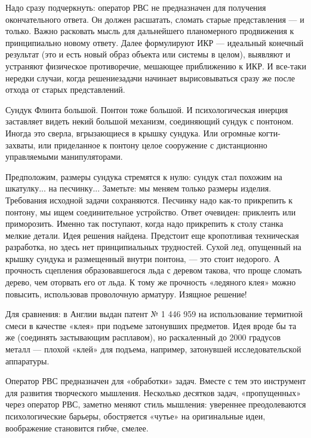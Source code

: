 Надо  сразу подчеркнуть:  оператор РВС  не предназначен  для получения
окончательного   ответа.   Он   должен   расшатать,   сломать   старые
представления  —  и  только.  Важно расковать  мысль  для  дальнейшего
планомерного   продвижения  к   принципиально  новому   ответу.  Далее
формулируют  ИКР —  идеальный  конечный результат  (это  и есть  новый
образ объекта  или системы в  целом), выявляют и  устраняют физическое
противоречие, мешающее  приближению к ИКР. И  все-таки нередки случаи,
когда решениезадачи  начинает вырисовываться сразу же  после отхода от
старых представлений.

Сундук Флинта большой. Понтон  тоже большой. И психологическая инерция
заставляет  видеть  некий  большой   механизм,  соединяющий  сундук  с
понтоном.  Иногда  это  сверла,  вгрызающиеся в  крышку  сундука.  Или
огромные когти-захваты,  или приделанное к понтону  целое сооружение с
дистанционно управляемыми манипуляторами.

Предположим,  размеры сундука  стремятся к  нулю: сундук  стал похожим
на  шкатулку...  на песчинку...  Заметьте:  мы  меняем только  размеры
изделия. Требования исходной задачи  сохраняются. Песчинку надо как-то
прикрепить  к  понтону,  мы   ищем  соединительное  устройство.  Ответ
очевиден: приклеить или приморозить.  Именно так поступают, когда надо
прикрепить  к  столу  станка  мелкие  детали.  Идея  решения  найдена.
Предстоит  еще  кропотливая  техническая   разработка,  но  здесь  нет
принципиальных  трудностей. Сухой  лед,  опущенный  на крышку  сундука
и  размещенный  внутри понтона,  —  это  стоит недорого.  А  прочность
сцепления  образовавшегося льда  с деревом  такова, что  проще сломать
дерево, чем оторвать его от льда.  К тому же прочность «ледяного клея»
можно повысить, использовав проволочную арматуру. Изящное решение!

Для сравнения:  в Англии  выдан патент  № 1  446 959  на использование
термитной смеси  в качестве  «клея» при подъеме  затонувших предметов.
Идея вроде бы та же  (соединять застывающим расплавом), но раскаленный
до  2000  градусов  металл  — плохой  «клей»  для  подъема,  например,
затонувшей исследовательской аппаратуры.

Оператор  РВС  предназначен  для   «обработки»  задач.  Вместе  с  тем
это   инструмент   для   развития  творческого   мышления.   Несколько
десятков  задач,  «пропущенных»  через оператор  РВС,  заметно  меняют
стиль  мышления:  увереннее  преодолеваются  психологические  барьеры,
обостряется  «чутье»  на  оригинальные  идеи,  воображение  становится
гибче, смелее.

